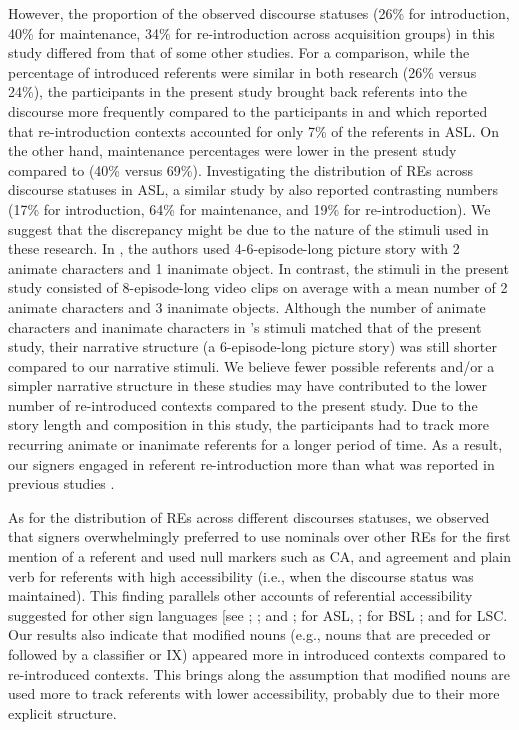\documentclass[review]{elsarticle} %
\begin{document}
However, the proportion of the observed discourse statuses (26\% for
introduction, 40\% for maintenance, 34\% for re-introduction across
acquisition groups) in this study differed from that of some other
studies. For a comparison, while the percentage of introduced referents
were similar in both research (26\% versus 24\%), the participants in
the present study brought back referents into the discourse more
frequently compared to the participants in \citet{frederiksen2019} and
\citet{frederiksen2016} which reported that re-introduction contexts
accounted for only 7\% of the referents in ASL. On the other hand,
maintenance percentages were lower in the present study compared to
\citet{frederiksen2016} (40\% versus 69\%). Investigating the
distribution of REs across discourse statuses in ASL, a similar study by
\citet{czubek2017} also reported contrasting numbers (17\% for
introduction, 64\% for maintenance, and 19\% for re-introduction). We
suggest that the discrepancy might be due to the nature of the stimuli
used in these research. In \citet{frederiksen2016}, the authors used
4-6-episode-long picture story with 2 animate characters and 1 inanimate
object. In contrast, the stimuli in the present study consisted of
8-episode-long video clips on average with a mean number of 2 animate
characters and 3 inanimate objects. Although the number of animate
characters and inanimate characters in \citet{czubek2017}'s stimuli
matched that of the present study, their narrative structure (a
6-episode-long picture story) was still shorter compared to our
narrative stimuli. We believe fewer possible referents and/or a simpler
narrative structure in these studies may have contributed to the lower
number of re-introduced contexts compared to the present study. Due to
the story length and composition in this study, the participants had to
track more recurring animate or inanimate referents for a longer period
of time. As a result, our signers engaged in referent re-introduction
more than what was reported in previous studies
\citep{czubek2017, frederiksen2016}.

As for the distribution of REs across different discourses statuses, we
observed that signers overwhelmingly preferred to use nominals over
other REs for the first mention of a referent and used null markers such
as CA, and agreement and plain verb for referents with high
accessibility (i.e., when the discourse status was maintained). This
finding parallels other accounts of referential accessibility suggested
for other sign languages {[}see \citet{frederiksen2016};
\citet{czubek2017}; and \citet{swabey2002}; for ASL, \citet{morgan2005};
for BSL \citet{bel2015}; and \citet{barbera2009} for LSC. Our results
also indicate that modified nouns (e.g., nouns that are preceded or
followed by a classifier or IX) appeared more in introduced contexts
compared to re-introduced contexts. This brings along the assumption
that modified nouns are used more to track referents with lower
accessibility, probably due to their more explicit structure.
\end{document}
